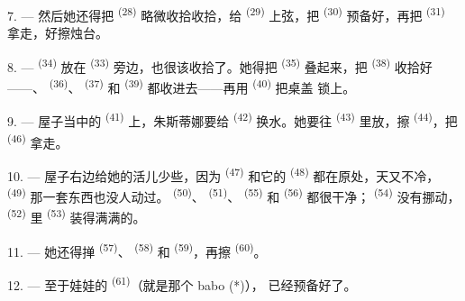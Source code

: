 7. --- 然后她还得把 \textsuperscript{(28)} 略微收拾收拾，给
 \textsuperscript{(29)} 上弦，把 \textsuperscript{(30)}
预备好，再把 \textsuperscript{(31)} 拿走，好擦烛台。

\VUsaut{5.0mm}
\VUsaut{3.0mm}

8. ---  \textsuperscript{(34)} 放在 \textsuperscript{(33)}
旁边，也很该收拾了。她得把 \textsuperscript{(35)} 叠起来，把
 \textsuperscript{(38)} 收拾好——、
\textsuperscript{(36)}、 \textsuperscript{(37)} 和
\textsuperscript{(39)} 都收进去——再用 \textsuperscript{(40)} 把桌盖
锁上。

9. --- 屋子当中的 \textsuperscript{(41)} 上，朱斯蒂娜要给
 \textsuperscript{(42)} 换水。她要往 \textsuperscript{(43)}
里放，擦 \textsuperscript{(44)}，把
\textsuperscript{(46)} 拿走。

10. --- 屋子右边给她的活儿少些，因为 \textsuperscript{(47)} 和它的
 \textsuperscript{(48)} 都在原处，天又不冷，
\textsuperscript{(49)} 那一套东西也没人动过。 \textsuperscript{(50)}、
 \textsuperscript{(51)}、 \textsuperscript{(55)} 和
 \textsuperscript{(56)} 都很干净； \textsuperscript{(54)}
没有挪动， \textsuperscript{(52)} 里 \textsuperscript{(53)}
装得满满的。



11. --- 她还得掸 \textsuperscript{(57)}、
\textsuperscript{(58)} 和 \textsuperscript{(59)}，再擦
\textsuperscript{(60)}。

12. --- 至于娃娃的 \textsuperscript{(61)}（就是那个 babo (*)），
已经预备好了。

\VUsaut{5.0mm}
\VUsaut{3.0mm}

